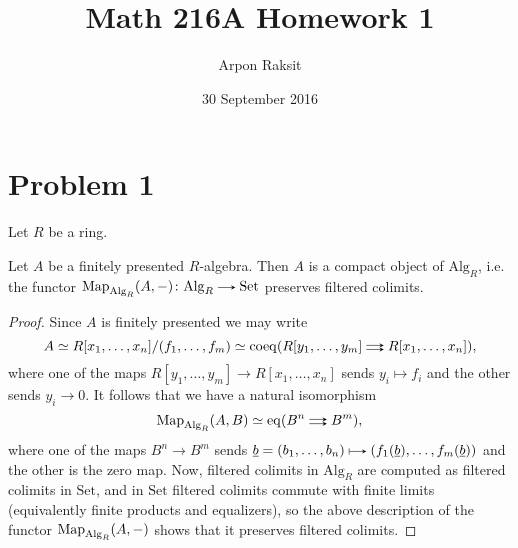 

\title{Math 216A Homework 1}
\author{Arpon Raksit}
\date{30 September 2016}





\maketitle

\newcommand{\Alg}{\mathrm{Alg}}
\newcommand{\Set}{\mathrm{Set}}
\newcommand{\nil}{\mathrm{nil}}
\newcommand{\red}{\mathrm{red}}


\section{Problem 1}

Let $R$ be a ring.

\begin{lemma}
  \label{fp-compact}
  Let $A$ be a finitely presented $R$-algebra. Then $A$ is a compact object of $\Alg_R$, i.e. the functor $\Map_{\Alg_R}(A,-) \c \Alg_R \to \Set$ preserves filtered colimits.
\end{lemma}

\begin{proof}
  Since $A$ is finitely presented we may write
  \[
    A \iso R[x_1,\ldots,x_n]/(f_1,\ldots,f_m)
      \iso \coeq(R[y_1,\ldots,y_m] \doubto R[x_1,\ldots,x_n]),
  \]
  where one of the maps $R[y_1,\ldots,y_m] \to R[x_1,\ldots,x_n]$ sends $y_i \mapsto f_i$ and the other sends $y_i \to 0$. It follows that we have a natural isomorphism
  \[
    \Map_{\Alg_R}(A,B) \iso \eq(B^n \doubto B^m),
  \]
  where one of the maps $B^n \to B^m$ sends $\u b = (b_1,\ldots,b_n) \mapsto (f_1(\u b), \ldots, f_m(\u b))$ and the other is the zero map. Now, filtered colimits in $\Alg_R$ are computed as filtered colimits in $\Set$, and in $\Set$ filtered colimits commute with finite limits (equivalently finite products and equalizers), so the above description of the functor $\Map_{\Alg_R}(A,-)$ shows that it 
preserves filtered colimits.
\end{proof}

